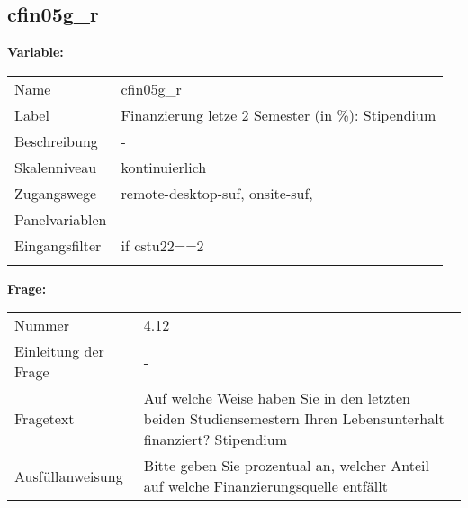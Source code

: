 	
	
	\subsection{cfin05g\_r}
	\label{subSection:cfin05g_r}

	\noindent\textbf{Variable:}\\
		\begin{tabular}{lL{11.3cm}}
			\label{tableVariable:cfin05g_r}
			Name & cfin05g\_r \\
			Label & Finanzierung letze 2 Semester (in \%): Stipendium \\
			Beschreibung & - \\
			Skalenniveau & kontinuierlich \\
			Zugangswege &
				remote-desktop-suf,
				onsite-suf,
 \\
			Panelvariablen & -
			 \\
			Eingangsfilter & if cstu22==2 \\
 \\
		\end{tabular}

		\vspace*{1 cm}
		\noindent\textbf{Frage:}\\
		\begin{tabular}{lL{11.3cm}}
			\label{tableQuestion:cfin05g_r}
			Nummer & 4.12 \\
			Einleitung der Frage & - \\
			Fragetext & Auf welche Weise haben Sie in den letzten beiden Studiensemestern Ihren Lebensunterhalt finanziert?
Stipendium \\
			Ausfüllanweisung & Bitte geben Sie prozentual an, welcher Anteil auf welche Finanzierungsquelle entfällt \\
		\end{tabular}





